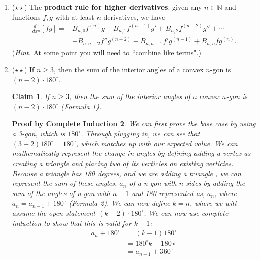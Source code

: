 \documentclass[10pt]{letter}
\newtheorem{PBCI}{Proof by Complete Induction}
\newtheorem{claim}{Claim}
\theoremstyle{definition}
\begin{document}
\begin{description}
\begin{enumerate}
\begin{PBCI}
\begin{align*}
&=f_rf_{r+1}+f^2_{r+1} \tag{Substituted using induction hypothesis}\\
&=f_{r+1}(f_r+f_{r+1} \\
&=f_{r+1}f_{r+2} \tag{Use definition of fibbanachi sequence along with complete induction by adding 1 to r in definition and substitute.}
\end{align*}
As we can see above, through proof by complete induction we have shown that $\displaystyle\sum_{k=1}^2f_k^2=f_2f_{3}=2$ is true for all k. $\qed$
\end{PBCI}
		\item ($\star\star$) The {\bfseries product rule for higher derivatives}: given any $n\in\mathbb{N}$ and functions $f,g$ with at least $n$ derivatives, we have 
				\begin{align*}
					\frac{d^n}{dx^n}\left[ f g\right]=&B_{n,0}f^{(n)}g+B_{n,1}f^{(n-1)}g'+B_{n,2}f^{(n-2)}g''+\cdots\\&+B_{n,n-2}f''g^{(n-2)}+B_{n,n-1}f'g^{(n-1)}+B_{n,n}fg^{(n)}.
				\end{align*}
			 	({\em Hint.} At some point you will need to ``combine like terms".)
		\item ($\star\star$) If $n\geq 3$, then the sum of the interior angles of a convex $n$-gon is $(n-2)\cdot 180^\circ$.
\begin{claim}
If $n\geq 3$, then the sum of the interior angles of a convex $n$-gon is $(n-2)\cdot 180^\circ$ (Formula 1).
\end{claim}
\begin{PBCI}
We can first prove the base case by using a 3-gon, which is $180^\circ$. Through plugging in, we can see that $(3-2)180^\circ=180^\circ$, which matches up with our expected value. We can mathematically represent the change in angles by defining adding a vertex as creating a triangle and placing two of its verticies on existing verticies. Because a triangle has 180 degrees, and we are adding a triangle , we can represent the sum of these angles, $a_n$ of a n-gon with $n$ sides by adding the sum of the angles of n-gon with $n-1$ and 180 represented as, $a_n$, where $a_{n}=a_{n-1}+180^\circ$ (Formula 2). We can now define $k=n$, where we will assume the open statement $(k-2)\cdot 180^\circ$. We can now use complete induction to show that this is valid for $k+1$:\\
\begin{align*}
a_{n}+180^\circ&=(k-1)180^\circ \\
&=180^\circ k-180\circ \\
&=a_{n-1}+360^\circ \tag{Substitute using inductive hypothesis}\\

\end{align*}
\end{PBCI}
\end{enumerate}
\end{description}
\end{document}
